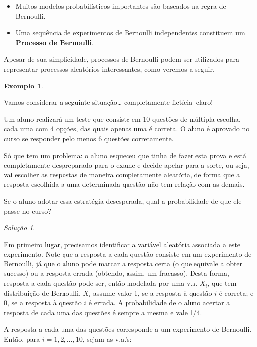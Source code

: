\documentclass[
]{book}
\providecommand{\tightlist}{%
  \setlength{\itemsep}{0pt}\setlength{\parskip}{0pt}}
\theoremstyle{definition}
\theoremstyle{definition}
\newtheorem{example}{Exemplo}[chapter]
\theoremstyle{definition}
\theoremstyle{remark}
\newtheorem*{solution}{Solução}
\begin{document}
\begin{itemize}
\tightlist
\item
  Muitos modelos probabilísticos importantes são baseados na regra de Bernoulli.
\item
  Uma sequência de experimentos de Bernoulli independentes constituem um \textbf{Processo de Bernoulli}.
\end{itemize}

Apesar de sua simplicidade, processos de Bernoulli podem ser utilizados para representar processos aleatórios interessantes, como veremos a seguir.

\begin{example}
\protect\hypertarget{exm:unnamed-chunk-1}{}{\label{exm:unnamed-chunk-1} }
\end{example}

Vamos considerar a seguinte situação\ldots{} completamente fictícia, claro!

Um aluno realizará um teste que consiste em 10 questões de múltipla escolha, cada uma com 4 opções, das quais apenas uma é correta. O aluno é aprovado no curso se responder pelo menos 6 questões corretamente.

Só que tem um problema: o aluno esqueceu que tinha de fazer esta prova e está completamente despreparado para o exame e decide apelar para a sorte, ou seja, vai escolher as respostas de maneira completamente aleatória, de forma que a resposta escolhida a uma determinada questão não tem relação com as demais.

Se o aluno adotar essa estratégia desesperada, qual a probabilidade de que ele passe no curso?

\begin{solution}
{}
\end{solution}

Em primeiro lugar, precisamos identificar a variável aleatória associada a este experimento. Note que a resposta a cada questão consiste em um experimento de Bernoulli, já que o aluno pode marcar a resposta certa (o que equivale a obter sucesso) ou a resposta errada (obtendo, assim, um fracasso). Desta forma, resposta a cada questão pode ser, então modelada por uma v.a. \(X_i\), que tem distribuição de Bernoulli. \(X_i\) assume valor 1, se a resposta à questão \(i\) é correta; e 0, se a resposta à questão \(i\) é errada. A probabilidade de o aluno acertar a resposta de cada uma das questões é sempre a mesma e vale 1/4.

A resposta a cada uma das questões corresponde a um experimento de Bernoulli. Então, para \(i = 1, 2, \ldots, 10\), sejam as v.a.'s:
\end{document}
